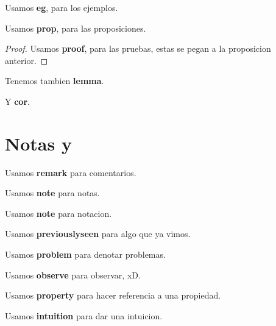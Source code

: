 \begin{eg}
  Usamos \textbf{eg}, para los ejemplos.
\end{eg}


\begin{prop}
  Usamos \textbf{prop}, para las proposiciones.
\end{prop}

\begin{proof}
  Usamos \textbf{proof}, para las pruebas, estas se pegan a la proposicion
  anterior.
\end{proof}

\begin{lemma}
	Tenemos tambien \textbf{lemma}.
\end{lemma}

\begin{cor}
	Y \textbf{cor}.
\end{cor}


\section{Notas y }

\begin{remark}
	Usamos \textbf{remark} para comentarios.
\end{remark}

\begin{note}
	Usamos \textbf{note} para notas.
\end{note}

\begin{notation}
	Usamos \textbf{note} para notacion.
\end{notation}


\begin{previouslyseen}
  Usamos \textbf{previouslyseen} para algo que ya vimos.
\end{previouslyseen}

\begin{problem}
  Usamos \textbf{problem} para denotar problemas.
\end{problem}

\begin{observe}
  Usamos \textbf{observe} para observar, xD.
\end{observe}

\begin{property}
  Usamos \textbf{property} para hacer referencia a una propiedad.
\end{property}

\begin{intuition}
  Usamos \textbf{intuition} para dar una intuicion.
\end{intuition}

